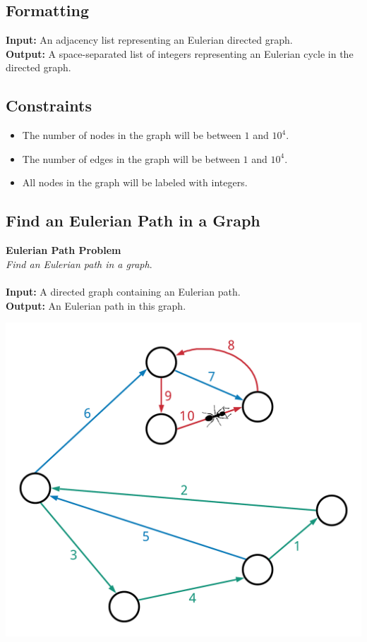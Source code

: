 \documentclass{article}
\begin{document}
\subsection*{Formatting}
\noindent\textbf{Input:} An adjacency list representing an Eulerian directed graph.\\
\noindent\textbf{Output:} A space-separated list of integers representing an Eulerian cycle in the directed graph.

\subsection*{Constraints}
\begin{itemize}
    \item The number of nodes in the graph will be between $1$ and $10^4$.
    \item The number of edges in the graph will be between $1$ and $10^4$.
    \item All nodes in the graph will be labeled with integers.
\end{itemize}
\pagebreak

\subsection{Find an Eulerian Path in a Graph}
\hline\vspace{5}
\textbf{Eulerian Path Problem}\\
\emph{Find an Eulerian path in a graph}.\\ \\
\textbf{Input:} A directed graph containing an Eulerian path.\\
\textbf{Output:} An Eulerian path in this graph.
\begin{center}
    \includegraphics[scale=0.12]{c3/logos/3G.png}
\end{center}
\hline\vspace{5}
\end{document}
